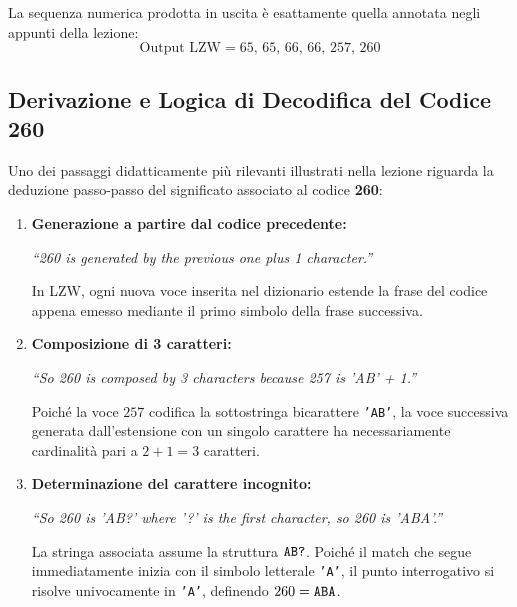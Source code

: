 La sequenza numerica prodotta in uscita \`e esattamente quella annotata negli appunti della lezione:
\begin{equation}
  \text{Output LZW} = 65, \, 65, \, 66, \, 66, \, 257, \, 260
\end{equation}

\FloatBarrier
\subsection{Derivazione e Logica di Decodifica del Codice 260}
\label{subsec:lzw-derivazione-260}

Uno dei passaggi didatticamente pi\`u rilevanti illustrati nella lezione riguarda la deduzione passo-passo del significato associato al codice \textbf{260}:
\begin{enumerate}
  \item \textbf{Generazione a partire dal codice precedente:}
  \begin{center}
    \textit{``260 is generated by the previous one plus 1 character.''}
  \end{center}
  In LZW, ogni nuova voce inserita nel dizionario estende la frase del codice appena emesso mediante il primo simbolo della frase successiva.
  \item \textbf{Composizione di 3 caratteri:}
  \begin{center}
    \textit{``So 260 is composed by 3 characters because 257 is 'AB' + 1.''}
  \end{center}
  Poich\'e la voce $257$ codifica la sottostringa bicarattere \texttt{'AB'}, la voce successiva generata dall'estensione con un singolo carattere ha necessariamente cardinalit\`a pari a $2 + 1 = 3$ caratteri.
  \item \textbf{Determinazione del carattere incognito:}
  \begin{center}
    \textit{``So 260 is 'AB?' where '?' is the first character, so 260 is 'ABA'.''}
  \end{center}
  La stringa associata assume la struttura $\text{\texttt{AB?}}$. Poich\'e il match che segue immediatamente inizia con il simbolo letterale \texttt{'A'}, il punto interrogativo si risolve univocamente in \texttt{'A'}, definendo $260 = \text{\texttt{ABA}}$.
\end{enumerate}

